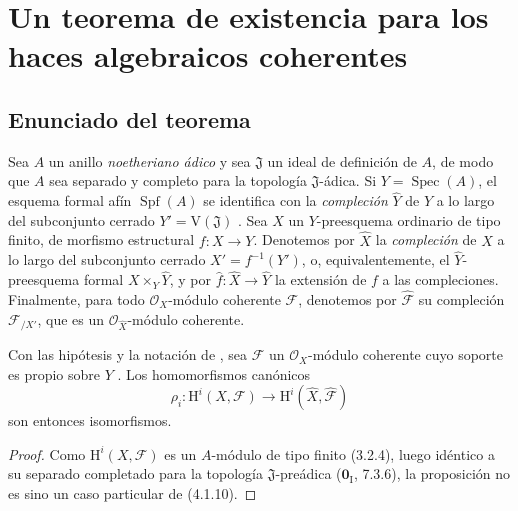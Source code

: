 \section{Un teorema de existencia para los haces algebraicos coherentes}
\label{section:III.5}
\label{section:III.5-fr}


\subsection{Enunciado del teorema}
\label{subsection:III.5.1}
\label{subsection:III.5.1-fr}

\begin{env}[5.1.1]
\label{III.5.1.1}
\label{III.5.1.1-fr}
Sea $A$ un anillo \emph{noetheriano ádico} y sea $\mathfrak J$ un ideal de
definición de $A$, de modo que $A$ sea separado y completo para la
topología $\mathfrak J$-ádica. Si $Y=\operatorname{Spec}(A)$, el esquema formal
afín $\operatorname{Spf}(A)$ se identifica con la \emph{compleción}
$\widehat Y$ de $Y$ a lo largo del subconjunto cerrado
$Y'=\mathrm V(\mathfrak J)$ . Sea $X$ un
$Y$-preesquema ordinario de tipo finito, de morfismo estructural
$f:X\to Y$. Denotemos por $\widehat X$ la \emph{compleción} de $X$ a lo largo
del subconjunto cerrado $X'=f^{-1}(Y')$, o, equivalentemente, el
$\widehat Y$-preesquema formal $X\times_Y\widehat Y$, y por
$\widehat f:\widehat X\to\widehat Y$ la extensión de $f$ a las
compleciones. Finalmente, para todo $\mathcal O_X$-módulo coherente
$\mathcal F$, denotemos por $\widehat{\mathcal F}$ su compleción
$\mathcal F_{/X'}$, que es un
$\mathcal O_{\widehat X}$-módulo coherente.
\end{env}

\begin{proposition}[5.1.2]
\label{III.5.1.2}
\label{III.5.1.2-fr}
Con las hipótesis y la notación de , sea $\mathcal F$
un $\mathcal O_X$-módulo coherente cuyo soporte es propio sobre $Y$
. Los homomorfismos canónicos
\[
\rho_i:\mathrm H^i(X,\mathcal F)\longrightarrow
\mathrm H^i(\widehat X,\widehat{\mathcal F})
\]
son entonces isomorfismos.
\end{proposition}

\begin{proof}
Como $\mathrm H^i(X,\mathcal F)$ es un $A$-módulo de tipo finito (3.2.4), luego
idéntico a su separado completado para la topología $\mathfrak J$-preádica
($\mathbf{0}_{\mathrm I}$, 7.3.6), la proposición no es sino un caso particular de (4.1.10).
\end{proof}

